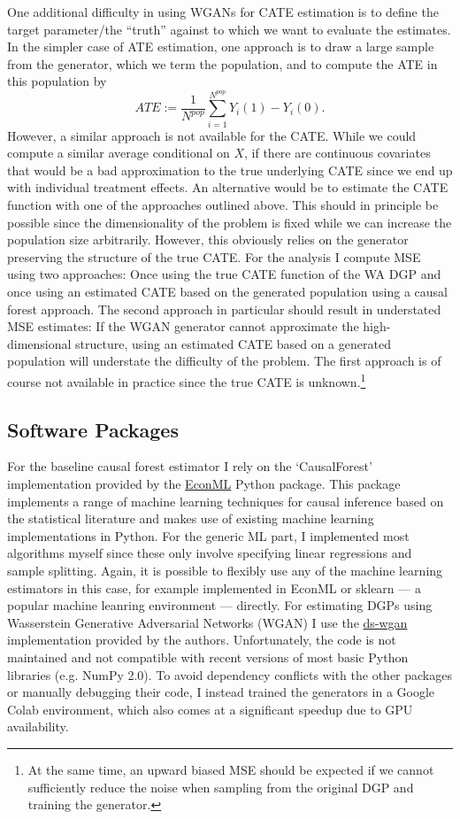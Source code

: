 \documentclass[11pt, a4paper, leqno]{article}
\begin{document}
One additional difficulty in using WGANs for CATE estimation is to define the target parameter/the ``truth'' against to which we want to evaluate the estimates.
In the simpler case of ATE estimation, one approach is to draw a large sample from the generator, which we term the population, and to compute the ATE in this population by
\begin{equation*}
    ATE := \frac{1}{N^{pop}} \sum_{i=1}^{N^{pop}} Y_i(1) - Y_i(0).
\end{equation*}
However, a similar approach is not available for the CATE\@.
While we could compute a similar average conditional on $X$, if there are continuous covariates that would be a bad approximation to the true underlying CATE since we end up with individual treatment effects.
An alternative would be to estimate the CATE function with one of the approaches outlined above. This should in principle be possible since the dimensionality of the problem is fixed while we can increase the population size arbitrarily.
However, this obviously relies on the generator preserving the structure of the true CATE\@.
For the analysis I compute MSE using two approaches: Once using the true CATE function of the WA DGP and once using an estimated CATE based on the generated population using a causal forest approach.
The second approach in particular should result in understated MSE estimates: If the WGAN generator cannot approximate the high-dimensional structure, using an estimated CATE based on a generated population will understate the difficulty of the problem.
The first approach is of course not available in practice since the true CATE is unknown.\footnote{At the same time, an upward biased MSE should be expected if we cannot sufficiently reduce the noise when sampling from the original DGP and training the generator.}

\subsection{Software Packages}
For the baseline causal forest estimator I rely on the `CausalForest' implementation provided by the \href{https://econml.azurewebsites.net/}{EconML} Python package.
This package implements a range of machine learning techniques for causal inference based on the statistical literature and makes use of existing machine learning implementations in Python.
For the generic ML part, I implemented most algorithms myself since these only involve specifying linear regressions and sample splitting.
Again, it is possible to flexibly use any of the machine learning estimators in this case, for example implemented in EconML or sklearn --- a popular machine leanring environment --- directly.
For estimating DGPs using Wasserstein Generative Adversarial Networks (WGAN) I use the \href{https://github.com/gsbDBI/ds-wgan}{ds-wgan} implementation provided by the authors.
Unfortunately, the code is not maintained and not compatible with recent versions of most basic Python libraries (e.g. NumPy 2.0).
To avoid dependency conflicts with the other packages or manually debugging their code, I instead trained the generators in a Google Colab environment, which also comes at a significant speedup due to GPU availability.
\end{document}
